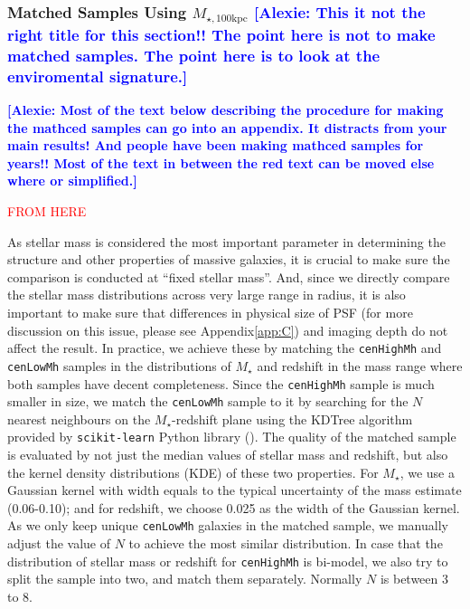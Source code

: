 \documentclass{emulateapj}
\def\rbcg{\texttt{cenHighMh}}
\def\nbcg{\texttt{cenLowMh}}
\def\mstar{{$M_{\star}$}}
\def\mtot{{$M_{\star,100\mathrm{kpc}}$}}
\newcommand{\alexie}[1]{\textcolor{blue}{\textbf{[Alexie: #1]}}}
\begin{document}
\begin{CJK*}{UTF8}{gbsn}

\subsubsection{Matched Samples Using \mtot{} \alexie{This it not the right title for this section!! The point here is not to make matched samples. The point here is to look at the enviromental signature.}}
    \label{sssec:sbp_mtot}

\alexie{Most of the text below describing the procedure for making the mathced samples can go into an appendix. It distracts from your main results! And people have been making mathced samples for years!! Most of the text in between the red text can be moved else where or simplified.}

  \textcolor{red}{FROM HERE}
  
  As stellar mass is considered the most important parameter in determining the 
    structure and other properties of massive galaxies, it is crucial to make sure 
    the comparison is conducted at ``fixed stellar mass''. 
    And, since we directly compare the stellar mass distributions across very large 
    range in radius, it is also important to make sure that differences in physical 
    size of PSF (for more discussion on this issue, please see Appendix\ref{app:C}) 
    and imaging depth do not affect the result.    
    In practice, we achieve these by matching the \rbcg{} and \nbcg{} samples in 
    the distributions of \mstar{} and redshift in the mass range where both 
    samples have decent completeness.  
    Since the \rbcg{} sample is much smaller in size, we match the \nbcg{} sample to it 
    by searching for the $N$ nearest neighbours on the $M_{\star}$-redshift 
    plane using the KDTree algorithm provided by \texttt{scikit-learn} Python 
    library (\citealt{scikit-learn}). 
    The quality of the matched sample is evaluated by not just the median values 
    of stellar mass and redshift, but also the kernel density distributions (KDE) 
    of these two properties.
    For \mstar{}, we use a Gaussian kernel with width equals to the typical 
    uncertainty of the mass estimate (0.06-0.10);
    and for redshift, we choose 0.025 as the width of the Gaussian kernel. 
    As we only keep unique \nbcg{} galaxies in the matched sample, we manually adjust 
    the value of $N$ to achieve the most similar distribution. 
    In case that the distribution of stellar mass or redshift for \rbcg{} is 
    bi-model, we also try to split the sample into two, and match them separately.
    Normally $N$ is between 3 to 8.
    

\end{CJK*}
\end{document}
